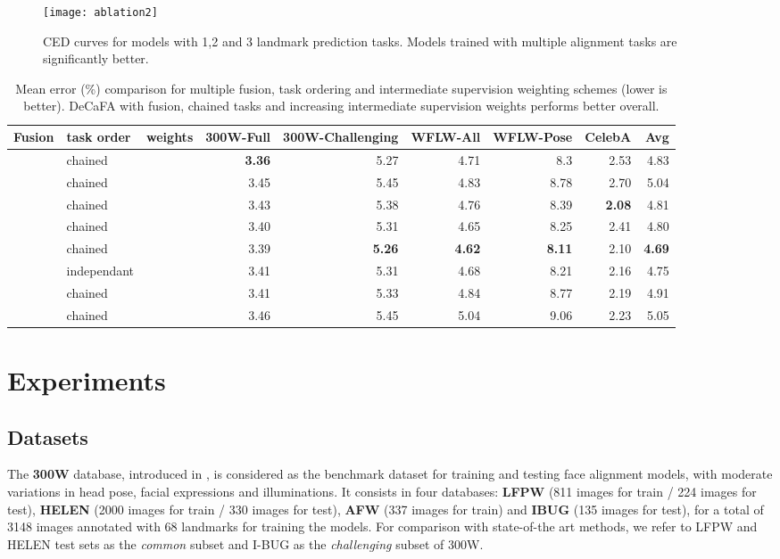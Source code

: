 \documentclass[10pt,twocolumn,letterpaper]{article}
\begin{document}
\begin{figure*}[h!]
	\centering
	\texttt{[image: ablation2]}
	\caption{CED curves for models with  1,2 and 3 landmark prediction tasks. Models trained with multiple alignment tasks are significantly better.}
	\label{ced2}
\end{figure*}

\begin{table*}[h!]
	\caption{Mean error (\%) comparison for multiple fusion, task ordering and intermediate supervision weighting schemes (lower is better). DeCaFA with  fusion, chained tasks and increasing intermediate supervision weights performs better overall.}
	\label{ablation1}
	\begin{tabular}{l|l|l|r|r|r|r|r|r}
		\hline
		Fusion & task order& weights &300W-Full & 300W-Challenging & WFLW-All & WFLW-Pose & CelebA & Avg\\
		\hline
		 &chained&& \textbf{3.36}&5.27&4.71&8.3&2.53&4.83\\
		  &chained&& 3.45&5.45&4.83&8.78&2.70&5.04\\
		 &chained && 3.43&5.38&4.76&8.39&\textbf{2.08}&4.81\\
		 &chained&& 3.40&5.31&4.65&8.25&2.41&4.80\\
		 &chained&& 3.39&\textbf{5.26}&\textbf{4.62}&\textbf{8.11}&2.10&\textbf{4.69}\\
		\hline
		 &independant&& 3.41  & 5.31 & 4.68 & 8.21 &2.16&4.75\\
		 &chained&& 3.41  & 5.33 & 4.84 & 8.77 &2.19&4.91\\
		 &chained&& 3.46  & 5.45 & 5.04 & 9.06 &2.23&5.05\\
		\hline
	\end{tabular}
\end{table*}

\section{Experiments}

\subsection{Datasets}\label{datasets}

The \textbf{300W} database, introduced in \cite{Sagonas2015}, is considered as the benchmark dataset for training and testing face alignment models, with moderate variations in head pose, facial expressions and illuminations. It consists in four databases: \textbf{LFPW} (811 images for train / 224 images for test), \textbf{HELEN} (2000 images for train / 330 images for test), \textbf{AFW} (337 images for train) and \textbf{IBUG} (135 images for test), for a total of 3148 images annotated with 68 landmarks for training the models. For comparison with state-of-the art methods, we refer to LFPW and HELEN test sets as the \textit{common} subset and I-BUG as the \textit{challenging} subset of 300W.
\end{document}
